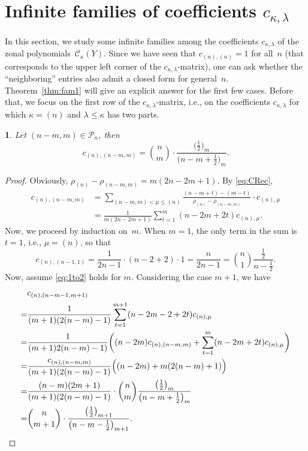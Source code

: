 \documentclass[smallextended]{svjour3}
\newtheorem{thm}{\protect\theoremname}
\providecommand{\theoremname}{Theorem}
\begin{document}
\section{Infinite families of coefficients $c_{\kappa,\lambda}$}
\label{sec:families}

In this section, we study some infinite families among the coefficients
$c_{\kappa,\lambda}$ of the zonal polynomials~$\mathcal{C}_{\kappa}(Y)$. Since we have
seen that $c_{(n),(n)}=1$ for all~$n$ (that corresponds to the upper left
corner of the $c_{\kappa,\lambda}$-matrix), one can ask whether the
``neighboring'' entries also admit a closed form for general~$n$.
Theorem~\ref{thm:fam1} will give an explicit answer for the first few cases.
Before that, we focus on the first row of the $c_{\kappa,\lambda}$-matrix,
i.e., on the coefficients $c_{\kappa,\lambda}$ for which
$\kappa=(n)$ and $\lambda\leq\kappa$ has two parts.

\begin{thm}\label{thm:row1}
Let $(n-m,m)\in\mathcal{P}_n$, then
\begin{equation}\label{eq:1to2}
  c_{(n),(n-m,m)} =
  \binom{n}{m}\cdot\frac{\bigl(\frac12\bigr)_m}{\bigl(n-m+\frac12\bigr)_m}.
\end{equation}
\end{thm}
\begin{proof}
Obviously, 
$ \rho_{(n)}-\rho_{(n-m,m)}=m(2n-2m+1)$. By \eqref{eq:CRec},
\begin{align*}
  c_{(n),(n-m,m)}
  &= \sum_{(n-m,m)<\mu\leq(n)}\frac{(n-m+t)-(m-t)}
    {\rho_{(n)}-\rho_{(n-m,m)}}\cdot c_{(n),\mu} \\
  &= \frac{1}{m(2n-2m+1)}\sum_{t=1}^{m}(n-2m+2t)c_{(n),\mu}.
\end{align*}
Now, we proceed by induction on~$m$. When $m=1$, the only term in the sum is $t=1$, i.e., $\mu=(n)$,  so that
\begin{equation}\label{eq:cnton1}
  c_{(n),(n-1,1)}=\frac{1}{2n-1}\cdot(n-2+2)\cdot1=\frac{n}{2n-1}=\binom{n}{1}\frac{\frac{1}{2}}{n-\frac{1}{2}}.
\end{equation}
Now, assume \eqref{eq:1to2} holds for $m$. Considering the case $m+1$, we have
\begin{align*}
 & c_{(n),(n-m-1,m+1)}  \\
 =& \frac{1}{(m+1)(2(n-m)-1)}\sum_{t=1}^{m+1}(n-2m-2+2t)c_{(n),\mu}\allowdisplaybreaks\\
= & \frac{1}{(m+1)2(n-m)-1)}\biggl((n-2m)c_{(n),(n-m,m)}+\sum_{t=1}^{m}(n-2m+2t)c_{(n),\mu}\biggr)\\
=& \frac{c_{(n),(n-m,m)}}{(m+1)(2(n-m)-1)}\Bigl((n-2m)+m(2(n-m)+1)\Bigr) \\
=& \frac{(n-m)(2m+1)}{(m+1)(2(n-m)-1)}\cdot\binom{n}{m}\frac{\bigl(\frac12\bigr)_m}{\bigl(n-m+\frac12\bigr)_m}\\
 =& \binom{n}{m+1}\cdot\frac{\bigl(\frac12\bigr)_{m+1}}{\bigl(n-m-\frac12\bigr)_{m+1}}.
\end{align*}
\end{proof}
\end{document}
